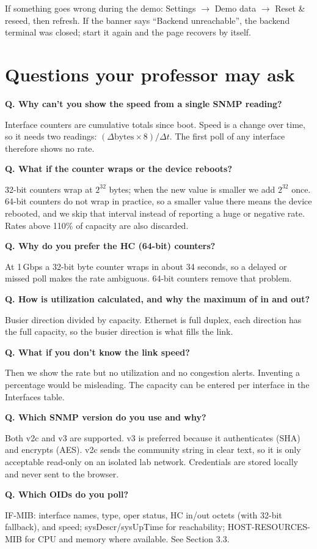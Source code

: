 \documentclass[11pt,a4paper]{article}
\newcommand{\qa}[2]{\par\textbf{\sffamily Q. #1}\par\vspace{-2pt}#2\par\vspace{4pt}}
\begin{document}
If something goes wrong during the demo: Settings $\rightarrow$ Demo data $\rightarrow$ Reset \& reseed, then refresh. If the banner says
``Backend unreachable'', the backend terminal was closed; start it again and the page recovers by itself.

\section{Questions your professor may ask}

\qa{Why can't you show the speed from a single SNMP reading?}{Interface counters are cumulative totals since boot. Speed is a
change over time, so it needs two readings: $(\Delta\text{bytes} \times 8) / \Delta t$. The first poll of any interface
therefore shows no rate.}

\qa{What if the counter wraps or the device reboots?}{32-bit counters wrap at $2^{32}$ bytes; when the new value is smaller we add
$2^{32}$ once. 64-bit counters do not wrap in practice, so a smaller value there means the device rebooted, and we skip that
interval instead of reporting a huge or negative rate. Rates above 110\% of capacity are also discarded.}

\qa{Why do you prefer the HC (64-bit) counters?}{At 1\,Gbps a 32-bit byte counter wraps in about 34 seconds, so a delayed or
missed poll makes the rate ambiguous. 64-bit counters remove that problem.}

\qa{How is utilization calculated, and why the maximum of in and out?}{Busier direction divided by capacity. Ethernet is full
duplex, each direction has the full capacity, so the busier direction is what fills the link.}

\qa{What if you don't know the link speed?}{Then we show the rate but no utilization and no congestion alerts. Inventing a
percentage would be misleading. The capacity can be entered per interface in the Interfaces table.}

\qa{Which SNMP version do you use and why?}{Both v2c and v3 are supported. v3 is preferred because it authenticates (SHA) and
encrypts (AES). v2c sends the community string in clear text, so it is only acceptable read-only on an isolated lab network.
Credentials are stored locally and never sent to the browser.}

\qa{Which OIDs do you poll?}{IF-MIB: interface names, type, oper status, HC in/out octets (with 32-bit fallback), and speed;
sysDescr/sysUpTime for reachability; HOST-RESOURCES-MIB for CPU and memory where available. See Section 3.3.}
\end{document}
